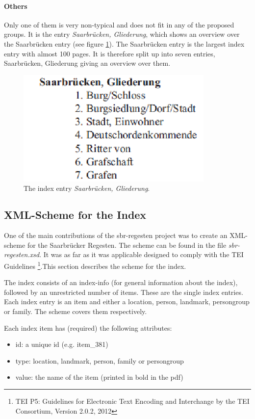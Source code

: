\paragraph{Others}
Only one of them is very non-typical and does not fit in any of the proposed groups. It is the entry \textit{Saarbrücken, Gliederung}, which shows an overview over the Saarbrücken entry (see figure \ref{fig:sb-gliederung}). The Saarbrücken entry is the largest index entry with almost 100 pages. It is therefore split up into seven entries, Saarbrücken, Gliederung giving an overview over them.

\begin{figure}[h]
  \centering
  \includegraphics[scale=0.6]{img/sb-gliederung}
  \caption{The index entry \textit{Saarbrücken, Gliederung}.}
  \label{fig:sb-gliederung}
\end{figure}


\subsection{XML-Scheme for the Index}

One of the main contributions of the sbr-regesten project was to create an XML-scheme for the Saarbrücker Regesten. The scheme can be found in the file \textit{sbr-regesten.xsd}.
It was as far as it was applicable designed to comply with the TEI Guidelines \footnote{TEI P5: Guidelines for Electronic Text Encoding and Interchange by the TEI Consortium, Version 2.0.2, 2012}.This section describes the scheme for the index.

The index consists of an index-info (for general information about the index), followed by an unrestricted number of items. These are the single index entries.
Each index entry is an item and either a location, person, landmark, persongroup or family. The scheme covers them respectively.

Each index item has (required) the following attributes: 
\begin{itemize}
\item id: a unique id (e.g. item\_381)
\item type: location, landmark, person, family or persongroup
\item value: the name of the item (printed in bold in the pdf)
\end{itemize}

